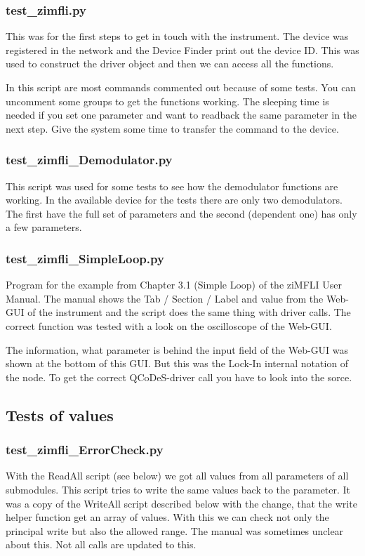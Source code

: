 \documentclass[11pt]{article} %
\begin{document}
\subsubsection{test\_zimfli.py}
This was for the first steps to get in touch with the instrument. The device was registered in the network and the Device Finder print out the device ID. This was used to construct the driver object and then we can access all the functions.

In this script are most commands commented out because of some tests. You can uncomment some groups to get the functions working. The sleeping time is needed if you set one parameter and want to readback the same parameter in the next step. Give the system some time to transfer the command to the device.

\subsubsection{test\_zimfli\_Demodulator.py}
This script was used for some tests to see how the demodulator functions are working. In the available device for the tests there are only two demodulators. The first have the full set of parameters and the second (dependent one) has only a few parameters.

\subsubsection{test\_zimfli\_SimpleLoop.py}
Program for the example from Chapter 3.1 (Simple Loop) of the ziMFLI User Manual. The manual shows the Tab / Section / Label and value from the Web-GUI of the instrument and the script does the same thing with driver calls. The correct function was tested with a look on the oscilloscope of the Web-GUI.

The information, what parameter is behind the input field of the Web-GUI was shown at the bottom of this GUI. But this was the Lock-In internal notation of the node. To get the correct QCoDeS-driver call you have to look into the sorce.


\subsection{Tests of values}

\subsubsection{test\_zimfli\_ErrorCheck.py}
With the ReadAll script (see below) we got all values from all parameters of all submodules. This script tries to write the same values back to the parameter. It was a copy of the WriteAll script described below with the change, that the write helper function get an array of values. With this we can check not only the principal write but also the allowed range. The manual was sometimes unclear about this. Not all calls are updated to this.
\end{document}
